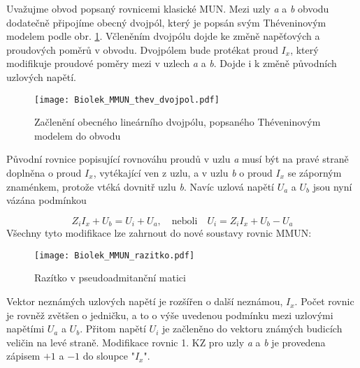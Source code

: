         Uvažujme obvod popsaný rovnicemi klasické MUN. Mezi uzly \emph{a} a \emph{b} obvodu 
        dodatečně připojíme obecný dvojpól, který je popsán svým Théveninovým modelem podle obr. 
        \ref{TEO:fig_MMUN_thev_dvojpol}. Včleněním dvojpólu dojde ke změně napěťových a proudových 
        poměrů v obvodu. Dvojpólem bude protékat proud $I_x$, který modifikuje proudové poměry mezi 
        v uzlech \emph{a} a \emph{b}. Dojde i k změně původních uzlových napětí.
        
        \begin{figure}[ht!]
          \centering
          \texttt{[image: Biolek\_MMUN\_thev\_dvojpol.pdf]}
          \caption[MMUN - Théveninův model dvojpólu]{Začlenění obecného lineárního dvojpólu, 
                   popsaného Théveninovým modelem do obvodu \cite[s.~78]{Biolek}}
          \label{TEO:fig_MMUN_thev_dvojpol}
        \end{figure}
        
        Původní rovnice popisující rovnováhu proudů v uzlu \emph{a} musí být na pravé straně 
        doplněna o proud $I_x$, vytékající ven z uzlu, a v uzlu \emph{b} o proud $I_x$ se záporným 
        znaménkem, protože vtéká dovnitř uzlu \emph{b}. Navíc uzlová napětí $U_a$ a $U_b$ jsou nyní 
        vázána podmínkou
        
        \begin{equation}\label{TEO:eq_MMUN_dvojpol}
          Z_iI_x + U_b = U_i + U_a, \quad\text{neboli}\quad U_i = Z_iI_x + U_b - U_a
        \end{equation}
        Všechny tyto modifikace lze zahrnout do nové soustavy rovnic MMUN:
        
        \begin{figure}[ht!]
          \centering
          \texttt{[image: Biolek\_MMUN\_razitko.pdf]}
          \caption[MMUN - razítko]{ Razítko v pseudoadmitanční matici \cite[s.~79]{Biolek}}
          \label{TEO:fig_MMUN_razitko}
        \end{figure}
        
        Vektor neznámých uzlových napětí je rozšířen o další neznámou, $I_x$. Počet rovnic je 
        rovněž zvětšen o jedničku, a to o výše uvedenou podmínku mezi uzlovými napětími $U_a$ a 
        $U_b$. Přitom napětí $U_i$ je začleněno do vektoru známých budicích veličin na levé straně. 
        Modifikace rovnic 1. KZ pro uzly \emph{a} a \emph{b} je provedena zápisem $+1$ a $-1$ do 
        sloupce "$I_x$".
        
